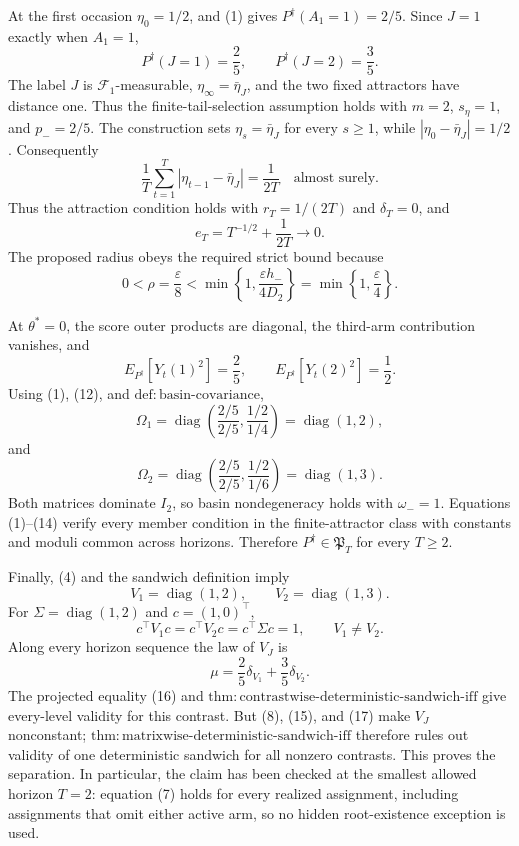 At the first occasion \(\eta_0=1/2\), and (1) gives \(P^{\dagger}(A_1=1)=2/5\). Since \(J=1\) exactly when \(A_1=1\),
\[
 P^{\dagger}(J=1)=\frac25,
 \qquad P^{\dagger}(J=2)=\frac35.
\tag{8}
\]
The label \(J\) is \(\mathcal F_1\)-measurable, \(\eta_\infty=\bar\eta_J\), and the two fixed attractors have distance one. Thus the finite-tail-selection assumption holds with \(m=2\), \(s_\eta=1\), and \(p_-=2/5\). The construction sets \(\eta_s=\bar\eta_J\) for every \(s\ge1\), while \(|\eta_0-\bar\eta_J|=1/2\). Consequently
\[
 \frac1T\sum_{t=1}^T|\eta_{t-1}-\bar\eta_J|=\frac1{2T}
 \quad\text{almost surely}.
\tag{9}
\]
Thus the attraction condition holds with \(r_T=1/(2T)\) and \(\delta_T=0\), and
\[
 e_T=T^{-1/2}+\frac1{2T}\longrightarrow0.
\tag{10}
\]
The proposed radius obeys the required strict bound because
\[
 0<\rho=\frac\varepsilon8
 <\min\left\{1,\frac{\varepsilon h_-}{4D_2}\right\}
 =\min\left\{1,\frac\varepsilon4\right\}.
\tag{11}
\]

At \(\theta^*=0\), the score outer products are diagonal, the third-arm contribution vanishes, and
\[
 E_{P^{\dagger}}[Y_t(1)^2]=\frac25,
 \qquad E_{P^{\dagger}}[Y_t(2)^2]=\frac12.
\tag{12}
\]
Using (1), (12), and \(\mathrm{def:basin\text{-}covariance}\),
\[
 \Omega_1=\operatorname{diag}\left(\frac{2/5}{2/5},\frac{1/2}{1/4}\right)
 =\operatorname{diag}(1,2),
\tag{13}
\]
and
\[
 \Omega_2=\operatorname{diag}\left(\frac{2/5}{2/5},\frac{1/2}{1/6}\right)
 =\operatorname{diag}(1,3).
\tag{14}
\]
Both matrices dominate \(I_2\), so basin nondegeneracy holds with \(\omega_-=1\). Equations (1)--(14) verify every member condition in the finite-attractor class with constants and moduli common across horizons. Therefore \(P^{\dagger}\in\mathfrak P_T\) for every \(T\ge2\).

Finally, (4) and the sandwich definition imply
\[
 V_1=\operatorname{diag}(1,2),
 \qquad V_2=\operatorname{diag}(1,3).
\tag{15}
\]
For \(\Sigma=\operatorname{diag}(1,2)\) and \(c=(1,0)^\top\),
\[
 c^\top V_1c=c^\top V_2c=c^\top\Sigma c=1,
 \qquad V_1\ne V_2.
\tag{16}
\]
Along every horizon sequence the law of \(V_J\) is
\[
 \mu=\frac25\delta_{V_1}+\frac35\delta_{V_2}.
\tag{17}
\]
The projected equality (16) and \(\mathrm{thm:contrastwise\text{-}deterministic\text{-}sandwich\text{-}iff}\) give every-level validity for this contrast. But (8), (15), and (17) make \(V_J\) nonconstant; \(\mathrm{thm:matrixwise\text{-}deterministic\text{-}sandwich\text{-}iff}\) therefore rules out validity of one deterministic sandwich for all nonzero contrasts. This proves the separation. In particular, the claim has been checked at the smallest allowed horizon \(T=2\): equation (7) holds for every realized assignment, including assignments that omit either active arm, so no hidden root-existence exception is used.